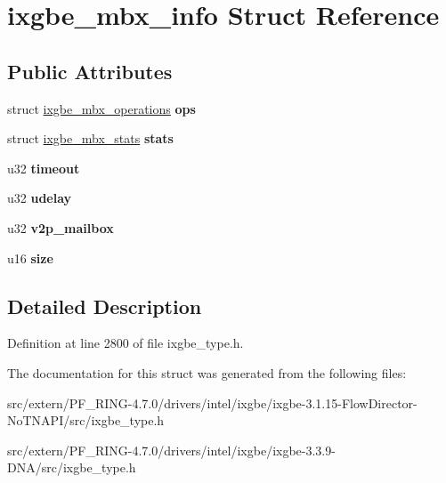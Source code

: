 \hypertarget{structixgbe__mbx__info}{
\section{ixgbe\_\-mbx\_\-info Struct Reference}
\label{structixgbe__mbx__info}
}
\subsection*{Public Attributes}
\begin{DoxyCompactItemize}
\item 
\hypertarget{structixgbe__mbx__info_af85dc4389d29857cfaeda3dd7532123e}{
struct \hyperlink{structixgbe__mbx__operations}{ixgbe\_\-mbx\_\-operations} {\bfseries ops}}
\label{structixgbe__mbx__info_af85dc4389d29857cfaeda3dd7532123e}

\item 
\hypertarget{structixgbe__mbx__info_af03d398abee8a1845d4a4ac66f2ad59b}{
struct \hyperlink{structixgbe__mbx__stats}{ixgbe\_\-mbx\_\-stats} {\bfseries stats}}
\label{structixgbe__mbx__info_af03d398abee8a1845d4a4ac66f2ad59b}

\item 
\hypertarget{structixgbe__mbx__info_acd335704ec15786ab5a3e2b0b76c3ac3}{
u32 {\bfseries timeout}}
\label{structixgbe__mbx__info_acd335704ec15786ab5a3e2b0b76c3ac3}

\item 
\hypertarget{structixgbe__mbx__info_a4656a73365c0f1fa67337ec2ba101bb2}{
u32 {\bfseries udelay}}
\label{structixgbe__mbx__info_a4656a73365c0f1fa67337ec2ba101bb2}

\item 
\hypertarget{structixgbe__mbx__info_a848b104d3a5b47143c2f7b62b71403ae}{
u32 {\bfseries v2p\_\-mailbox}}
\label{structixgbe__mbx__info_a848b104d3a5b47143c2f7b62b71403ae}

\item 
\hypertarget{structixgbe__mbx__info_ae9f862d3feb224520e9a185cdd1a1134}{
u16 {\bfseries size}}
\label{structixgbe__mbx__info_ae9f862d3feb224520e9a185cdd1a1134}

\end{DoxyCompactItemize}


\subsection{Detailed Description}


Definition at line 2800 of file ixgbe\_\-type.h.



The documentation for this struct was generated from the following files:\begin{DoxyCompactItemize}
\item 
src/extern/PF\_\-RING-\/4.7.0/drivers/intel/ixgbe/ixgbe-\/3.1.15-\/FlowDirector-\/NoTNAPI/src/ixgbe\_\-type.h\item 
src/extern/PF\_\-RING-\/4.7.0/drivers/intel/ixgbe/ixgbe-\/3.3.9-\/DNA/src/ixgbe\_\-type.h\end{DoxyCompactItemize}
